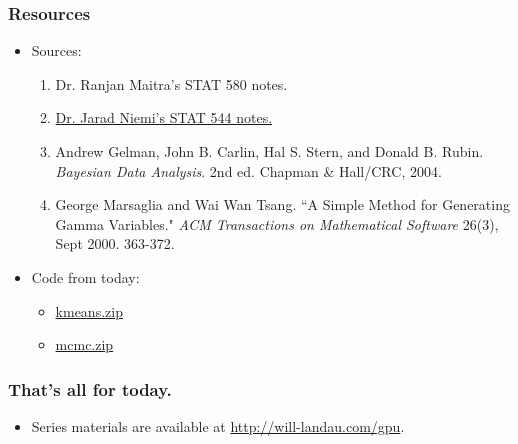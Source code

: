 \documentclass[handout]{beamer}
\numberwithin{equation}{section}
\begin{document}
\begin{frame}
\frametitle{Resources} \small

\begin{itemize}
\item Sources:
\begin{enumerate}
\item Dr. Ranjan Maitra's STAT 580 notes.
\pause \item \href{http://jarad.me/stat544/archive.html}{Dr. Jarad Niemi's STAT 544 notes.}
\pause \item Andrew Gelman, John B. Carlin, Hal S. Stern, and Donald B. Rubin. \emph{Bayesian Data Analysis}. 2nd ed. Chapman \& Hall/CRC, 2004.
\pause \item George Marsaglia and Wai Wan Tsang. ``A Simple Method for Generating Gamma Variables." \emph{ACM Transactions on Mathematical Software} 26(3), Sept 2000. 363-372.
\end{enumerate}
\pause \item Code from today:
\begin{itemize}
\item \href{http://will-landau.com/gpu/Code/CUDA_C/kmeans/kmeans.zip}{kmeans.zip}
\item \href{http://will-landau.com/gpu/Code/CUDA_C/mcmc/mcmc.zip}{mcmc.zip}
\end{itemize}
\end{itemize}
\end{frame}



\begin{frame}
\frametitle{That's all for today.}
\begin{itemize}
\item Series materials are available at \url{http://will-landau.com/gpu}.
\end{itemize}
\end{frame}
\end{document}
